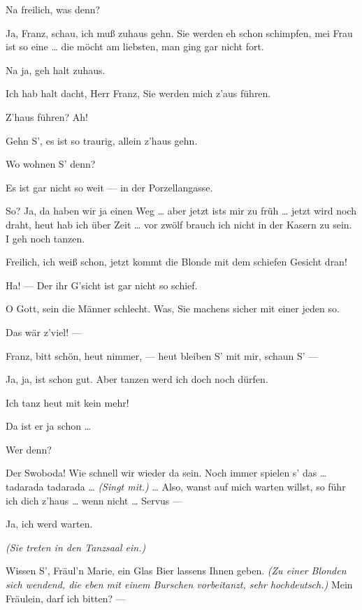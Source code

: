 \documentclass[
	final,
	a4paper,
	ngerman,
	mpinclude = true, %
	twoside = true,
	open = right,
	cleardoublepage = plain,
	DIV = 13,
	BCOR = 1cm,
	titlepage = firstiscover,
	]{scrbook}
\newcommand{\direction}[1]{\textit{(#1)}}
\newcommand{\thecharacter}[1]{\textup{\textsc{#1}}}
\newcommand{\thesoldat}{\thecharacter{Soldat}}
\newcommand{\themaedchen}{\thecharacter{Stubenmädchen}}
\newcommand{\character}[1]{\item[#1:]}
\newcommand{\soldat}{\character{\thesoldat}}
\newcommand{\maedchen}{\character{\themaedchen}}
\begin{document}
\begin{play}
	\soldat
	Na freilich, was denn?

	\maedchen
	Ja, Franz, schau, ich muß zuhaus gehn. Sie werden eh schon schimpfen, mei Frau ist so eine \ldots{} die möcht am liebsten, man ging gar nicht fort.

	\soldat
	Na ja, geh halt zuhaus.

	\maedchen
	Ich hab halt dacht, Herr Franz, Sie werden mich z'aus führen.

	\soldat
	Z'haus führen? Ah!

	\maedchen
	Gehn S', es ist so traurig, allein z'haus gehn.

	\soldat
	Wo wohnen S' denn?

	\maedchen
	Es ist gar nicht so weit --- in der Porzellangasse.

	\soldat
	So? Ja, da haben wir ja einen Weg \ldots{} aber jetzt ists mir zu früh \ldots{} jetzt wird noch draht, heut hab ich über Zeit \ldots{} vor zwölf brauch ich nicht in der Kasern zu sein. I geh noch tanzen.

	\maedchen
	Freilich, ich weiß schon, jetzt kommt die Blonde mit dem schiefen Gesicht dran!

	\soldat
	Ha! --- Der ihr G'sicht ist gar nicht so schief.

	\maedchen
	O Gott, sein die Männer schlecht. Was, Sie machens sicher mit einer jeden so.

	\soldat
	Das wär z'viel! ---

	\maedchen
	Franz, bitt schön, heut nimmer, --- heut bleiben S' mit mir, schaun S' ---

	\soldat
	Ja, ja, ist schon gut. Aber tanzen werd ich doch noch dürfen.

	\maedchen
	Ich tanz heut mit kein mehr!

	\soldat
	Da ist er ja schon \ldots{}

	\maedchen
	Wer denn?

	\soldat
	Der Swoboda! Wie schnell wir wieder da sein. Noch immer spielen s' das \ldots{} tadarada tadarada \ldots{} \direction{Singt mit.} \ldots{} Also, wanst auf mich warten willst, so führ ich dich z'haus \ldots{} wenn nicht \ldots{} Servus ---

	\maedchen
	Ja, ich werd warten.

	\direction{Sie treten in den Tanzsaal ein.}

	\soldat
	Wissen S', Fräul'n Marie, ein Glas Bier lassens Ihnen geben. \direction{Zu einer Blonden sich wendend, die eben mit einem Burschen vorbeitanzt, sehr hochdeutsch.} Mein Fräulein, darf ich bitten? ---

\end{play}
\end{document}
